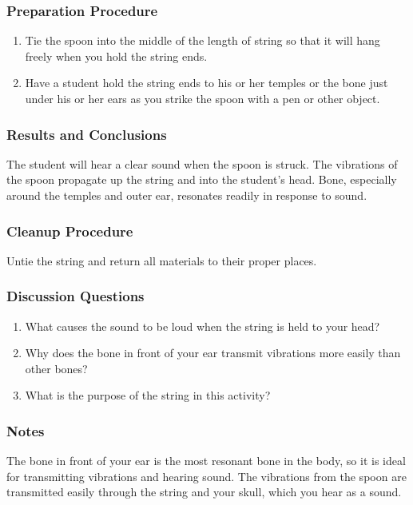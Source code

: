 \subsubsection*{Preparation Procedure}
\begin{enumerate}
\item{Tie the spoon into the middle of the length of string so that it will hang freely when you hold the string ends.}
\item{Have a student hold the string ends to his or her temples or the bone just under his or her ears as you strike the spoon with a pen or other object.}
\end{enumerate}

\subsubsection*{Results and Conclusions}
The student will hear a clear sound when the spoon is struck.  The vibrations of the spoon propagate up the string and into
the student's head. Bone, especially around the temples and outer ear, resonates readily in response to sound.

\subsubsection*{Cleanup Procedure}
Untie the string and return all materials to their proper places.

\subsubsection*{Discussion Questions}
\begin{enumerate}
\item{What causes the sound to be loud when the string is held to your head?}
\item{Why does the bone in front of your ear transmit vibrations more easily than other bones?}
\item{What is the purpose of the string in this activity?}
\end{enumerate}

\subsubsection*{Notes}
The bone in front of your ear is the most resonant bone in the body, so it is ideal for transmitting vibrations and hearing sound.  The vibrations from the spoon are transmitted easily through the string and your skull, which you hear as a sound.


